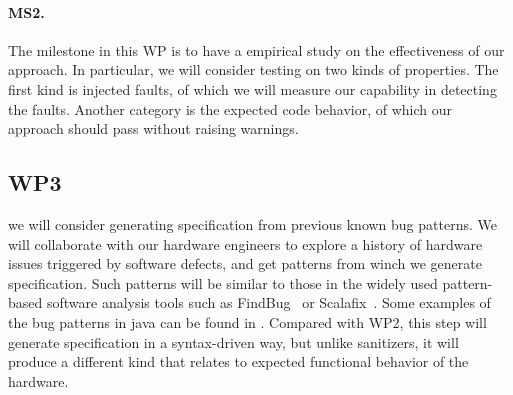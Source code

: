 \documentclass[fleqn,12pt]{article}
\begin{document}
\paragraph{MS2.} The milestone in this WP is to have a empirical study on the effectiveness of our approach. In particular,  we will consider testing on two kinds of properties. The first kind is injected faults, of which we will measure our capability in detecting the faults. Another category is the expected code behavior, of which our approach should  pass without raising  warnings. 







\subsection{WP3}   we will  consider generating specification from  previous known bug patterns.  We will collaborate with our hardware engineers to explore a
history of hardware issues triggered by software defects, and get
patterns from winch we generate specification. Such patterns will be
similar to those in the widely used pattern-based software analysis
tools such as FindBug~\cite{DBLP:conf/paste/AyewahPMPZ07} or
Scalafix~\cite{web:scalafix}. Some examples of the bug patterns in
java can be found in \cite{web:findbugs_bugs}. Compared with WP2, this
step will  generate specification in a syntax-driven way, but
unlike sanitizers, it will produce a different kind that  relates
to expected functional behavior of the hardware.
\end{document}
